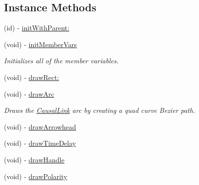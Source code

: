 \subsection*{Instance Methods}
\begin{DoxyCompactItemize}
\item 
(id) -\/ \hyperlink{interface_causal_link_view_af6c10f878fb1c7f420cc964aa0822992}{init\-With\-Parent\-:}
\item 
\hypertarget{interface_causal_link_view_aab9db45cbade40771ab30e01ff837142}{(void) -\/ \hyperlink{interface_causal_link_view_aab9db45cbade40771ab30e01ff837142}{init\-Member\-Vars}}\label{interface_causal_link_view_aab9db45cbade40771ab30e01ff837142}

\begin{DoxyCompactList}\small\item\em Initializes all of the member variables. \end{DoxyCompactList}\item 
(void) -\/ \hyperlink{interface_causal_link_view_a8c03538769a6fcbd7aa8e672cf4b5c96}{draw\-Rect\-:}
\item 
\hypertarget{interface_causal_link_view_a481c18609b8c7f6b790109ce163f0c5a}{(void) -\/ \hyperlink{interface_causal_link_view_a481c18609b8c7f6b790109ce163f0c5a}{draw\-Arc}}\label{interface_causal_link_view_a481c18609b8c7f6b790109ce163f0c5a}

\begin{DoxyCompactList}\small\item\em Draws the \hyperlink{interface_causal_link}{Causal\-Link} arc by creating a quad curve Bezier path. \end{DoxyCompactList}\item 
(void) -\/ \hyperlink{interface_causal_link_view_ad98cea31468b62d41184831cf9c779e1}{draw\-Arrowhead}
\item 
(void) -\/ \hyperlink{interface_causal_link_view_a59c2ffcd4e00222816f63842ed7311c0}{draw\-Time\-Delay}
\item 
(void) -\/ \hyperlink{interface_causal_link_view_ae80de0f1a90ac5fbc4cfada5278af48e}{draw\-Handle}
\item 
\hypertarget{interface_causal_link_view_abf9591a3ec825d59181114cc72560e3f}{(void) -\/ \hyperlink{interface_causal_link_view_abf9591a3ec825d59181114cc72560e3f}{draw\-Polarity}}\label{interface_causal_link_view_abf9591a3ec825d59181114cc72560e3f}


\end{DoxyCompactItemize}
